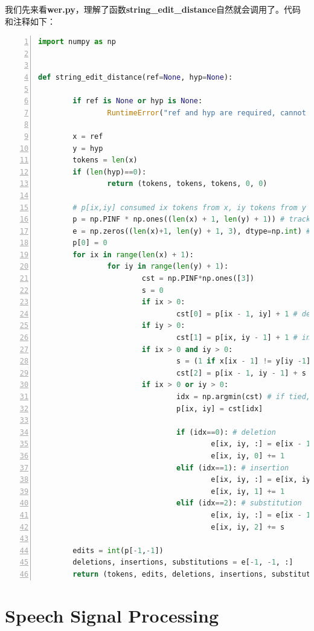 我们先来看{\bf wer.py}，理解了函数{\bf string\_edit\_distance}自然就会调用了。代码和注释如下：
\begin{lstlisting}[language = python, numbers=left, 
				 numberstyle=\tiny,keywordstyle=\color{blue!70},
				 commentstyle=\color{red!50!green!50!blue!50},frame=shadowbox,
				 rulesepcolor=\color{red!20!green!20!blue!20},basicstyle=\ttfamily]
import numpy as np


def string_edit_distance(ref=None, hyp=None):

		if ref is None or hyp is None:
				RuntimeError("ref and hyp are required, cannot be None")

		x = ref
		y = hyp
		tokens = len(x)
		if (len(hyp)==0):
				return (tokens, tokens, tokens, 0, 0)

		# p[ix,iy] consumed ix tokens from x, iy tokens from y
		p = np.PINF * np.ones((len(x) + 1, len(y) + 1)) # track total errors
		e = np.zeros((len(x)+1, len(y) + 1, 3), dtype=np.int) # track deletions, insertions, substitutions
		p[0] = 0
		for ix in range(len(x) + 1):
				for iy in range(len(y) + 1):
						cst = np.PINF*np.ones([3])
						s = 0
						if ix > 0:
								cst[0] = p[ix - 1, iy] + 1 # deletion cost
						if iy > 0:
								cst[1] = p[ix, iy - 1] + 1 # insertion cost
						if ix > 0 and iy > 0:
								s = (1 if x[ix - 1] != y[iy -1] else 0)
								cst[2] = p[ix - 1, iy - 1] + s # substitution cost
						if ix > 0 or iy > 0:
								idx = np.argmin(cst) # if tied, one that occurs first wins
								p[ix, iy] = cst[idx]

								if (idx==0): # deletion
										e[ix, iy, :] = e[ix - 1, iy, :]
										e[ix, iy, 0] += 1
								elif (idx==1): # insertion
										e[ix, iy, :] = e[ix, iy - 1, :]
										e[ix, iy, 1] += 1
								elif (idx==2): # substitution
										e[ix, iy, :] = e[ix - 1, iy - 1, :]
										e[ix, iy, 2] += s

		edits = int(p[-1,-1])
		deletions, insertions, substitutions = e[-1, -1, :]
		return (tokens, edits, deletions, insertions, substitutions)
\end{lstlisting}

\section{Speech Signal Processing}

